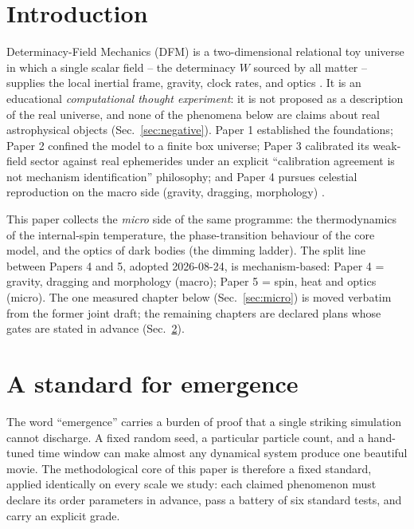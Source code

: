 \documentclass[aps,reprint,amsmath,amssymb,nofootinbib,superscriptaddress,floatfix]{revtex4-2}
\begin{document}
\section{Introduction}

Determinacy-Field Mechanics (DFM) is a two-dimensional relational toy
universe in which a single scalar field -- the determinacy $W$ sourced by
all matter -- supplies the local inertial frame, gravity, clock rates,
and optics \cite{paper1}. It is an educational \emph{computational
thought experiment}: it is not proposed as a description of the real
universe, and none of the phenomena below are claims about real
astrophysical objects (Sec.~\ref{sec:negative}). Paper 1 established the
foundations; Paper 2 confined the model to a finite box universe; Paper 3
calibrated its weak-field sector against real ephemerides under an
explicit ``calibration agreement is not mechanism identification''
philosophy; and Paper 4 pursues celestial reproduction on the macro side
(gravity, dragging, morphology) \cite{paper2,paper3,paper4}.

This paper collects the \emph{micro} side of the same programme: the
thermodynamics of the internal-spin temperature, the phase-transition
behaviour of the core model, and the optics of dark bodies (the dimming
ladder). The split line between Papers 4 and 5, adopted 2026-08-24, is
mechanism-based: Paper 4 = gravity, dragging and morphology (macro);
Paper 5 = spin, heat and optics (micro). The one measured chapter below
(Sec.~\ref{sec:micro}) is moved verbatim from the former joint draft;
the remaining chapters are declared plans whose gates are stated in
advance (Sec.~\ref{sec:standard}).

\section{A standard for emergence}
\label{sec:standard}

The word ``emergence'' carries a burden of proof that a single striking
simulation cannot discharge. A fixed random seed, a particular particle
count, and a hand-tuned time window can make almost any dynamical system
produce one beautiful movie. The methodological core of this paper is
therefore a fixed standard, applied identically on every scale we study:
each claimed phenomenon must declare its order parameters in advance,
pass a battery of six standard tests, and carry an explicit grade.
\end{document}
